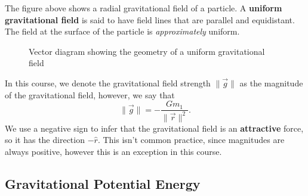 The figure above shows a radial gravitational field of a particle. A \textbf{uniform gravitational field} is said to have field lines that are parallel and equidistant. The field at the surface of the particle is \textit{approximately} uniform. 

\begin{figure}[h!]
    \centering
    \caption{Vector diagram showing the geometry of a uniform gravitational field}
\end{figure}
\FloatBarrier

In this course, we denote the gravitational field strength $\| \vec{g} \|$ as the magnitude of the gravitational field, however, we say that 
\begin{equation}
    \label{eq:gravitational-field-strength}
    \| \vec{g} \| = - \frac{Gm_1}{\| \vec{r} \|^2}.
\end{equation}
We use a negative sign to infer that the gravitational field is an \textbf{attractive} force, so it has the direction $-\hat{r}$. This isn't common practice, since magnitudes are always positive, however this is an exception in this course. 

\subsection{Gravitational Potential Energy}

